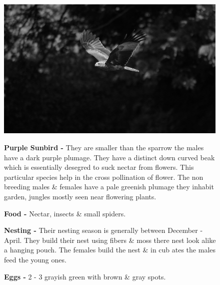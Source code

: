 \begin{figure}[H]
\begin{center}
\includegraphics{figure/Land_birds/01_pariah_kite/pariah-kite.eps}
\end{center}
\medskip
\noindent
{\bf Purple Sunbird -} They are smaller than the sparrow the males have a dark purple plumage. They have a distinct down curved beak which is essentially desegred  to suck nectar from flowers. This particular species help in the cross pollination of flower. The non breeding males \& females have a pale greenish plumage they inhabit garden, jungles mostly seen near flowering plants.

\medskip
{\bf Food -} Nectar, insects \& small spiders.

{\bf Nesting -} Their nesting season is generally between December - April. They build their nest using fibers \& moss there nest look alike a hanging pouch. The females build the nest \& in cub ates the males feed the young ones.

{\bf Eggs -} 2 - 3 grayish green with brown \& gray spots.
\end{figure}

\vfill\eject

~\phantom{a}
\vfill


